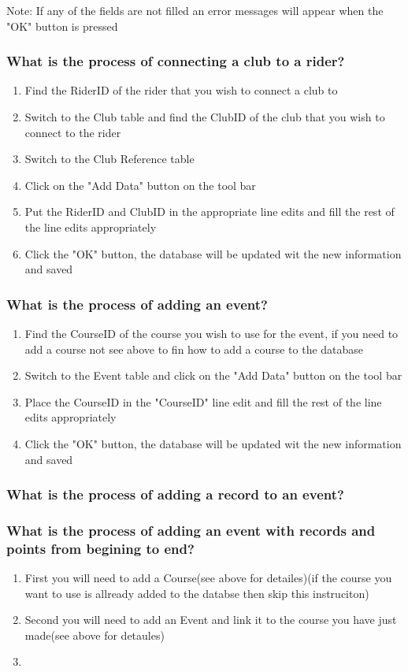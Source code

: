 Note: If  any of the fields are not filled an error messages will appear when the "OK" button is pressed

\subsubsection{What is the process of connecting a club to a rider?}
\begin{enumerate}
\item Find the RiderID of the rider that you wish to connect a club to
\item Switch to the Club table and find the ClubID of the club that you wish to connect to the rider
\item Switch to the Club Reference table
\item Click on the "Add Data" button on the tool bar
\item Put the RiderID and ClubID in the appropriate line edits and fill the rest of the line edits appropriately
\item Click the "OK" button, the database will be updated wit the new information and saved
\end{enumerate}
\subsubsection{What is the process of adding an event?}
\begin{enumerate}
\item Find the CourseID of the course you wish to use for the event, if you need to add a course not see above to fin how to add a course to the database
\item Switch to the Event table and click on the "Add Data" button on the tool bar
\item Place the CourseID in the "CourseID" line edit and fill the rest of the line edits appropriately
\item Click the "OK" button, the database will be updated wit the new information and saved
\end{enumerate}
\subsubsection{What is the process of adding a record to an event?}

\subsubsection{What is the process of adding an event with records and points from begining to end?}
\begin{enumerate}
\item First you will need to add a Course(see above for detailes)(if the course you want to use is allready added to the databse then skip this instruciton)
\item Second you will need to add an Event and link it to the course you have just made(see above for detaules)
\item 
\end{enumerate}

